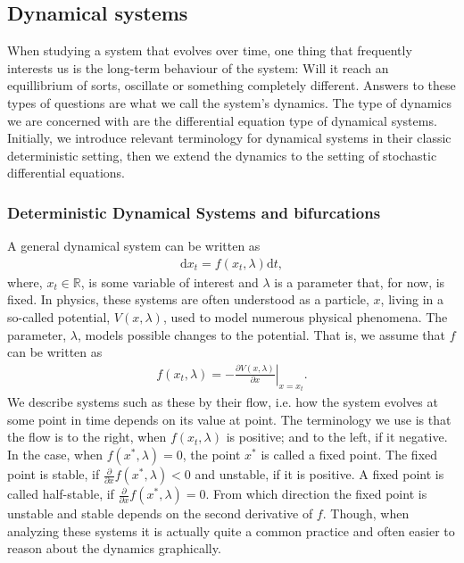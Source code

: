 \subsection{Dynamical systems}
When studying a system that evolves over time, one thing that frequently interests us is the long-term behaviour of the system: Will it reach an equillibrium of sorts, oscillate or something completely different. Answers to these types of questions are what we call the system's dynamics. The type of dynamics we are concerned with are the differential equation type of dynamical systems. Initially, we introduce relevant terminology for dynamical systems in their classic deterministic setting, then we extend the dynamics to the setting of stochastic differential equations. 
\subsubsection{Deterministic Dynamical Systems and bifurcations}
A general dynamical system can be written as
\begin{align}
    \mathrm{d}x_t = f(x_t, \lambda)\mathrm{d}t, \label{eq:generalDynamicalSystem}
\end{align}
where, $x_t\in\mathbb{R}$, is some variable of interest and $\lambda$ is a parameter that, for now, is fixed. In physics, these systems are often understood as a particle, $x$, living in a so-called potential, $V(x,\lambda)$, used to model numerous physical phenomena. The parameter, $\lambda$, models possible changes to the potential. That is, we assume that $f$ can be written as
\begin{align}
     f(x_t, \lambda) = \left.-\frac{\partial V(x,\lambda)}{\partial x}\right|_{x=x_t}.
\end{align}
We describe systems such as these by their flow, i.e. how the system evolves at some point in time depends on its value at point. The terminology we use is that the flow is to the right, when $f(x_t, \lambda)$ is positive; and to the left, if it negative. In the case, when $f(x^*, \lambda) = 0$, the point $x^*$ is called a fixed point. The fixed point is stable, if $\frac{\partial}{\partial x}f(x^*, \lambda) < 0$ and unstable, if it is positive. A fixed point is called half-stable, if $\frac{\partial}{\partial x}f(x^*, \lambda) = 0$. From which direction the fixed point is unstable and stable depends on the second derivative of $f$. Though, when analyzing these systems it is actually quite a common practice and often easier to reason about the dynamics graphically.\\\\
